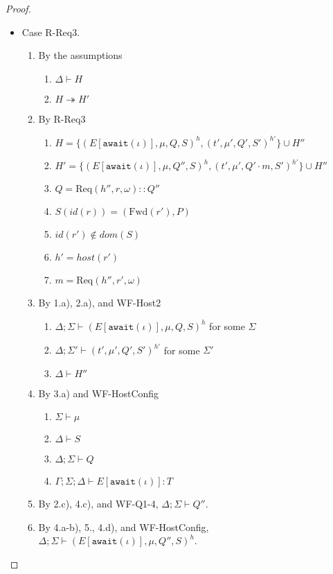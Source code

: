 \documentclass{article}
\theoremstyle{definition}
\newcommand{\Req}[3]{\text{Req}(#1, #2, #3)}
\newcommand{\Fwd}[1]{\text{Fwd}(#1)}
\begin{document}
\begin{proof}
\begin{itemize}
\item Case R-Req3.
\begin{enumerate}
\item By the assumptions
  \begin{enumerate}[label=(\alph*)]
  \item $\Delta \vdash H$
  \item $H \twoheadrightarrow H'$
  \end{enumerate}
\item By R-Req3
  \begin{enumerate}[label=(\alph*)]
  \item $H = \{ (E[\texttt{await}(\iota)], \mu, Q, S)^h, (t', \mu', Q', S')^{h'} \} \cup H''$
  \item $H' = \{ (E[\texttt{await}(\iota)], \mu, Q'', S)^h, (t', \mu', Q' \cdot m, S')^{h'} \} \cup H''$
  \item $Q         = {\Req {h''} r \omega} :: Q''$
  \item $S(id(r))  = (\Fwd{r'}, P)$
  \item $id(r') \notin dom(S)$
  \item $h'        = host(r')$
  \item $m         = {\Req {h''} {r'} \omega}$
  \end{enumerate}
\item By 1.a), 2.a), and WF-Host2
  \begin{enumerate}[label=(\alph*)]
  \item $\Delta ; \Sigma \vdash (E[\texttt{await}(\iota)], \mu, Q, S)^h$ for some $\Sigma$
  \item $\Delta ; \Sigma' \vdash (t', \mu', Q', S')^{h'}$ for some $\Sigma'$
  \item $\Delta \vdash H''$
  \end{enumerate}
\item By 3.a) and WF-HostConfig
  \begin{enumerate}[label=(\alph*)]
  \item $\Sigma \vdash \mu$
  \item $\Delta \vdash S$
  \item $\Delta ; \Sigma \vdash Q$
  \item $\Gamma ; \Sigma ; \Delta \vdash E[\texttt{await}(\iota)] : T$
  \end{enumerate}
\item By 2.c), 4.c), and WF-Q1-4, $\Delta ; \Sigma \vdash Q''$.
\item By 4.a-b), 5., 4.d), and WF-HostConfig, $\Delta ; \Sigma \vdash (E[\texttt{await}(\iota)], \mu, Q'', S)^h$.

\end{enumerate}
\end{itemize}
\end{proof}
\end{document}
